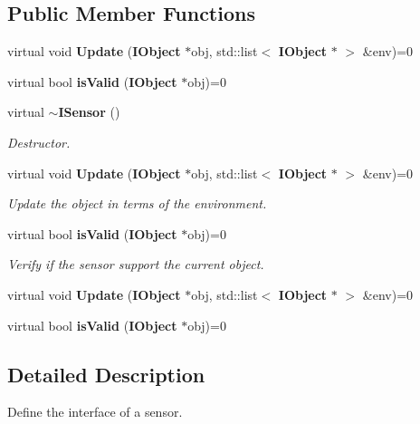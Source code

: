 \subsection*{Public Member Functions}
\begin{DoxyCompactItemize}
\item 
virtual void {\bfseries Update} ({\bf I\+Object} $\ast$obj, std\+::list$<$ {\bf I\+Object} $\ast$ $>$ \&env)=0\label{class_graphics_1_1_i_sensor_a898b379aa5b3c1e3bd0123a321b2c68a}

\item 
virtual bool {\bfseries is\+Valid} ({\bf I\+Object} $\ast$obj)=0\label{class_graphics_1_1_i_sensor_a7bfe9af666729794a423231e2d91c7c4}

\item 
virtual {\bf $\sim$\+I\+Sensor} ()\label{class_graphics_1_1_i_sensor_a48b21797770f8ab82091f5dac6fb77f1}

\begin{DoxyCompactList}\small\item\em Destructor. \end{DoxyCompactList}\item 
virtual void {\bf Update} ({\bf I\+Object} $\ast$obj, std\+::list$<$ {\bf I\+Object} $\ast$ $>$ \&env)=0
\begin{DoxyCompactList}\small\item\em Update the object in terms of the environment. \end{DoxyCompactList}\item 
virtual bool {\bf is\+Valid} ({\bf I\+Object} $\ast$obj)=0
\begin{DoxyCompactList}\small\item\em Verify if the sensor support the current object. \end{DoxyCompactList}\item 
virtual void {\bfseries Update} ({\bf I\+Object} $\ast$obj, std\+::list$<$ {\bf I\+Object} $\ast$ $>$ \&env)=0\label{class_graphics_1_1_i_sensor_a898b379aa5b3c1e3bd0123a321b2c68a}

\item 
virtual bool {\bfseries is\+Valid} ({\bf I\+Object} $\ast$obj)=0\label{class_graphics_1_1_i_sensor_a7bfe9af666729794a423231e2d91c7c4}

\end{DoxyCompactItemize}


\subsection{Detailed Description}
Define the interface of a sensor. 

